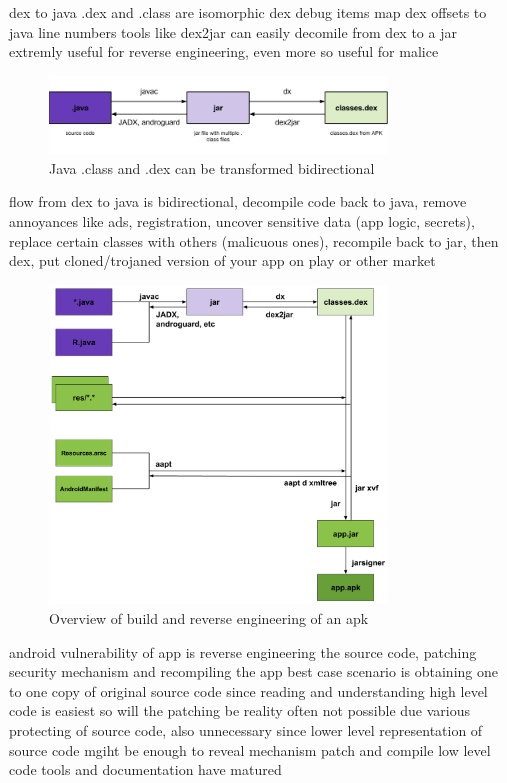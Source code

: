 %
dex to java
.dex and .class are isomorphic
dex debug items map dex offsets to java line numbers
tools like dex2jar can easily decomile from dex to a jar
extremly useful for reverse engineering, even more so useful for malice\newline
\begin{figure}[h]
    \centering
    \includegraphics[width=0.8\textwidth]{data/re1.png}
    \caption{Java .class and .dex can be transformed bidirectional \cite{andevconDalvikART}}
    \label{fig:re1}
\end{figure}
flow from dex to java is bidirectional, decompile code back to java, remove annoyances like ads, registration, uncover sensitive data (app logic, secrets), replace certain classes with others (malicuous ones), recompile back to jar, then dex, put cloned/trojaned version of your app on play or other market\newline
\begin{figure}[h]
    \centering
    \includegraphics[width=0.8\textwidth]{data/re2.png}
    \caption{Overview of build and reverse engineering of an \gls{apk} \cite{andevconDalvikART}}
    \label{fig:re2}
\end{figure}
\cite{andevconDalvikART}
%

%
android vulnerability of app is reverse engineering the source code, patching security mechanism and recompiling the app
best case scenario is obtaining one to one copy of original source code since reading and understanding high level code is easiest so will the patching be
reality often not possible due various protecting of source code, also unnecessary since lower level representation of source code mgiht be enough to reveal mechanism
patch and compile low level code tools and documentation have matured

